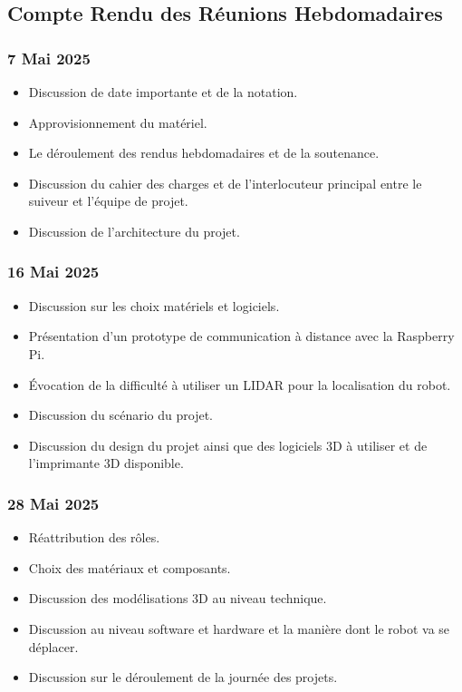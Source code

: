 \documentclass[a4paper,12pt]{report}  %
\begin{document}
\subsection{Compte Rendu des Réunions Hebdomadaires}

\subsubsection{7 Mai 2025}
\begin{itemize}%
	\item Discussion de date importante et de la notation.
	\item Approvisionnement du matériel.
	\item Le déroulement des rendus hebdomadaires et de la soutenance.
	\item Discussion du cahier des charges et de l'interlocuteur principal entre le suiveur et l’équipe de projet.
	\item Discussion de l’architecture du projet.
\end{itemize}

\subsubsection{16 Mai 2025}
\begin{itemize}%
	\item Discussion sur les choix matériels et logiciels.
	\item Présentation d'un prototype de communication à distance avec la Raspberry Pi.
	\item Évocation de la difficulté à utiliser un LIDAR pour la localisation du robot.
	\item Discussion du scénario du projet.
	\item Discussion du design du projet ainsi que des logiciels 3D à utiliser et de l'imprimante 3D disponible.
\end{itemize}

\subsubsection{28 Mai 2025}
\begin{itemize}%
	\item Réattribution des rôles.
	\item Choix des matériaux et composants.
	\item Discussion des modélisations 3D au niveau technique.
	\item Discussion au niveau software et hardware et la manière dont le robot va se déplacer.
	\item Discussion sur le déroulement de la journée des projets.
\end{itemize}
\end{document}
